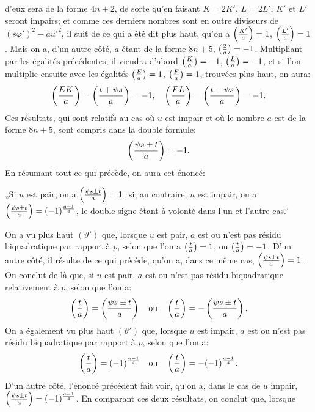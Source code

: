 \noindent
d'eux sera de la forme $4n+2$, de sorte qu'en faisant $K=2K'$, $L=2L'$, $K'$
et $L'$ seront impairs; et comme ces derniers nombres sont en outre diviseurs
de $(s\varphi')^2-au'^2$, il suit de ce qui a été dit plus haut, qu'on a $\left(\frac{K'}{a}\right)=1$,
$\left(\frac{L'}{a}\right)=1$. Mais on a, d'un autre côté, $a$ étant de la forme $8n+5$,
$\left(\frac{2}{a}\right)=-1$. Multipliant par les égalités précédentes, il viendra d'abord
$\left(\frac{K}{a}\right)=-1$, $\left(\frac{L}{a}\right)=-1$, et si l'on multiplie ensuite avec les égalités
$\left(\frac{E}{a}\right)=1$, $\left(\frac{F}{a}\right)=1$, trouvées plus haut, on aura:
\[
\left(\frac{EK}{a}\right)=\left(\frac{t+\psi s}{a}\right)=-1,\quad\left(\frac{FL}{a}\right)=\left(\frac{t-\psi s}{a}\right)=-1.
\]
Ces résultats, qui sont relatifs au cas où $u$ est impair et où le nombre $a$ est
de la forme $8n+5$, sont compris dans la double formule:
\[
\left(\frac{\psi s\pm t}{a}\right)=-1.
\]
En résumant tout ce qui précède, on aura cet énoncé:
\par\indent
„Si $u$ est pair, on a $\left(\frac{\psi s\pm t}{a}\right)=1$; si, au contraire, $u$ est impair, on a
$\left(\frac{\psi s\pm t}{a}\right)=(-1)^{\frac{a-1}{4}}$, le double signe étant à volonté dans l'un et l'autre cas.“
\par\indent
On a vu plus haut $(\vartheta')$ que, lorsque $u$ est pair, $a$ est ou n'est pas résidu
biquadratique par rapport à $p$, selon que l'on a $\left(\frac{t}{a}\right)=1$, ou $\left(\frac{t}{a}\right)=-1$.
D'un autre côté, il résulte de ce qui précède, qu'on a, dans ce même cas,
$\left(\frac{\psi s\pm t}{a}\right)=1$. On conclut de là que, si $u$ est pair, $a$ est ou n'est pas résidu
biquadratique relativement à $p$, selon que l'on a:
\[
\left(\frac{t}{a}\right)=\left(\frac{\psi s\pm t}{a}\right)\quad\text{ou}\quad
\left(\frac{t}{a}\right)=-\left(\frac{\psi s\pm t}{a}\right).
\]
On a également vu plus haut $(\vartheta')$ que, lorsque $u$ est impair, $a$ est ou n'est
pas résidu biquadratique par rapport à $p$, selon que l'on a:
\[
\left(\frac{t}{a}\right)=(-1)^{\frac{a-1}{4}}\quad\text{ou}\quad
\left(\frac{t}{a}\right)=-(-1)^{\frac{a-1}{4}}.
\]
D'un autre côté, l'énoncé précédent fait voir, qu'on a, dans le cas de $u$ impair,
$\left(\frac{\psi s\pm t}{a}\right)=(-1)^{\frac{a-1}{4}}$. En comparant ces deux résultats, on conclut que, lorsque
